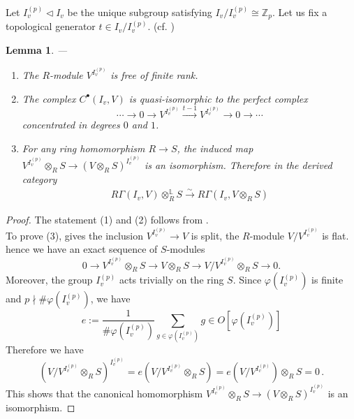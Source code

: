 \documentclass[10pt]{amsart}
\numberwithin{equation}{section}
\newtheorem{lemma}[thm]{Lemma}
\theoremstyle{definition}
\theoremstyle{remark} %
\newcommand{\Z}{\mathbb{Z}}
\begin{document}
	\subsubsection{}
	Let $ I_{v}^{(p)} \triangleleft I_v $ be the unique subgroup satisfying $ I_v/I_{v}^{(p)} \cong \Z_p$. Let us fix a topological generator $ t \in I_v/I_{v}^{(p)} $. (cf. \cite[.2]{NSW08})
	\begin{lemma} 
		\label{lemma : 2.9}
		---
		\begin{enumerate}[(1)]
			\item The $R$-module $V^{I_{v}^{(p)}}$ is free of finite rank.
			\item The complex $C^{\bullet}(I_v , V )$ is quasi-isomorphic to the perfect complex
			$$ \cdots \rightarrow 0 \rightarrow V^{I_{v}^{(p)}} \xrightarrow{t-1} V^{I_{v}^{(p)}} \rightarrow 0 \rightarrow \cdots  $$ concentrated in degrees $0$ and $1$.
			\item For any ring homomorphism $R \rightarrow S$, the induced map $ V^{I_{v}^{(p)}} \otimes_R S \rightarrow (V \otimes_R S)^{I_{v}^{(p)}}$ is an isomorphism. Therefore in the derived category 
			\begin{align*}
				R\Gamma(I_{v},V) \otimes^{\mathbb{L}}_R S \xrightarrow{\sim}  R\Gamma(I_{v},V \otimes_R S)
			\end{align*}
		\end{enumerate}
	\end{lemma}
	\begin{proof}
		The statement (1) and (2) follows from \cite[.8]{Nek06}. \\
		To prove (3), \cite[.8]{Nek06} gives the inclusion $V^{I_v^{(p)}} \to V$ is split, the $R$-module $V/V^{I_v^{(p)}}$ is flat. hence we have an exact sequence of $S$-modules  
		\[
		0 \longrightarrow   V^{I_v^{(p)}}\otimes_{R} S \longrightarrow V \otimes_{R} S \longrightarrow V/V^{I_v^{(p)}} \otimes_{R} S \longrightarrow 0. 
		\]
		Moreover, the group $I_v^{(p)}$ acts trivially on the ring $S$. Since $\varphi(I_v^{(p)})$ is finite and $p \nmid \#\varphi(I_v^{(p)})$, we have 
		\[
		e := \frac{1}{\# \varphi(I_v^{(p)})}\sum_{g \in \varphi(I_v^{(p)})}g \in O[\varphi(I_v^{(p)})]
		\] 
		Therefore we have 
		\[
		(V/V^{I_v^{(p)}} \otimes_{R} S)^{I_v^{(p)}} = e(V/V^{I_v^{(p)}} \otimes_{R} S) = e(V/V^{I_v^{(p)}}) \otimes_{R} S = 0\,. 
		\]
		This shows that the canonical homomorphism $V^{I_v^{(p)}} \otimes_R S \to (V \otimes_R S)^{I_v^{(p)}}$ is an isomorphism.  
	\end{proof}
	
\end{document}
